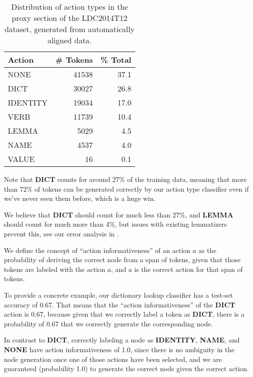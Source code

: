 \documentclass[11pt]{article}
\begin{document}
\begin{table}[h]
\begin{center}
\begin{tabular}{|l|rr|}
\hline \bf Action & \bf \# Tokens & \bf \% Total \\ \hline
NONE & 41538 & 37.1\\
DICT & 30027 & 26.8 \\
IDENTITY & 19034 & 17.0 \\
VERB & 11739 & 10.4 \\
LEMMA & 5029 & 4.5 \\
NAME & 4537 & 4.0 \\
VALUE & 16  & 0.1\\
\hline
\end{tabular}
\end{center}
\caption{\label{tab:distro} Distribution of action types in the proxy section of the LDC2014T12 dataset, generated from automatically aligned data. }
\end{table}

Note that \textbf{DICT} counts for around 27\% of the training data, meaning that more than 72\% of tokens can be generated correctly by our action type classifier even if we've never seen them before, which is a huge win.

We believe that \textbf{DICT} should count for much less than 27\%, and \textbf{LEMMA} should count for much more than 4\%, but issues with existing lemmatizers prevent this, see our error analysis in .


We define the concept of ``action informativeness'' of an action $a$ as the probability of deriving the correct node from a span of tokens, given that those tokens are labeled with the action $a$, and $a$ is the correct action for that span of tokens.

To provide a concrete example, our dictionary lookup classifier has a test-set accuracy of 0.67. That means that the ``action informativeness'' of the \textbf{DICT} action is 0.67, because given that we correctly label a token as \textbf{DICT}, there is a probability of 0.67 that we correctly generate the corresponding node.

In contrast to \textbf{DICT}, correctly labeling a node as \textbf{IDENTITY}, \textbf{NAME}, and \textbf{NONE} have action informativeness of 1.0, since there is no ambiguity in the node generation once one of those actions have been selected, and we are guaranteed (probability 1.0) to generate the correct node given the correct action.
\end{document}

